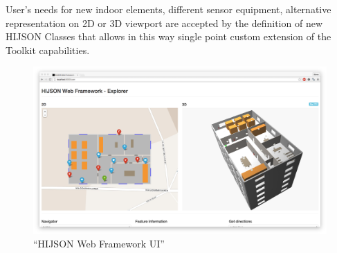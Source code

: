 User's needs for new indoor elements, different sensor equipment,
alternative representation on 2D or 3D viewport are accepted by the
definition of new HIJSON Classes that allows in this way single point
custom extension of the Toolkit capabilities.


\begin{figure}[htb]
\centering
\includegraphics[width=\textwidth]{images/web_framework_1.png}
\caption{``HIJSON Web Framework UI''}
\label{fig:web-framework-ui}
\end{figure}
